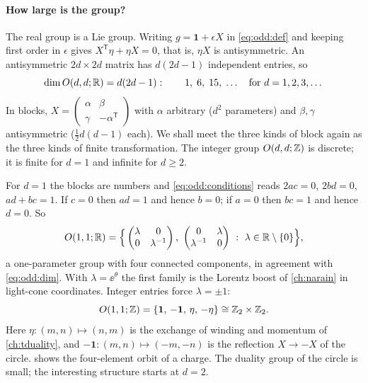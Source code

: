 \paragraph{How large is the group?} The real group is a Lie group. Writing
$g=\mathbf 1+\epsilon X$ in \eqref{eq:odd:def} and keeping first order in $\epsilon$ gives
$X^{\mathsf T}\eta+\eta X=0$, that is, $\eta X$ is antisymmetric. An antisymmetric
$2d\times2d$ matrix has $d(2d-1)$ independent entries, so
\begin{equation}\label{eq:odd:dim}
 \dim O(d,d;\mathbb{R})=d(2d-1):\qquad 1,\;6,\;15,\;\dots\quad\text{for }d=1,2,3,\dots
\end{equation}
In blocks, $X=\left(\begin{smallmatrix}\alpha&\beta\\ \gamma&-\alpha^{\mathsf T}
\end{smallmatrix}\right)$ with $\alpha$ arbitrary ($d^2$ parameters) and $\beta,\gamma$
antisymmetric ($\frac12d(d-1)$ each). We shall meet the three kinds of block again as the
three kinds of finite transformation. The integer group $O(d,d;\mathbb{Z})$ is discrete; it is finite
for $d=1$ and infinite for $d\geq2$.

\begin{example}[The case $d=1$, completely]\label{ex:odd:d1}
For $d=1$ the blocks are numbers and \eqref{eq:odd:conditions} reads $2ac=0$, $2bd=0$,
$ad+bc=1$. If $c=0$ then $ad=1$ and hence $b=0$; if $a=0$ then $bc=1$ and hence $d=0$. So
\begin{equation}\label{eq:odd:O11R}
 O(1,1;\R)=\Big\{\begin{pmatrix}\lambda&0\\0&\lambda^{-1}\end{pmatrix},\
 \begin{pmatrix}0&\lambda\\ \lambda^{-1}&0\end{pmatrix}\ :\ \lambda\in\R\setminus\{0\}\Big\},
\end{equation}
a one-parameter group with four connected components, in agreement with \eqref{eq:odd:dim}.
With $\lambda=\ee^{\theta}$ the first family is the Lorentz boost of \cref{ch:narain} in
light-cone coordinates. Integer entries force $\lambda=\pm1$:
\begin{equation}\label{eq:odd:O11Z}
 O(1,1;\mathbb{Z})=\{\mathbf 1,\,-\mathbf 1,\,\eta,\,-\eta\}\cong\mathbb{Z}_2\times\mathbb{Z}_2 .
\end{equation}
Here $\eta:(m,n)\mapsto(n,m)$ is the exchange of winding and momentum of
\cref{ch:tduality}, and $-\mathbf 1:(m,n)\mapsto(-m,-n)$ is the reflection $X\to-X$ of the
circle. \Cref{fig:odd:d1} shows the four-element orbit of a charge. The duality group of
the circle is small; the interesting structure starts at $d=2$.
\end{example}

